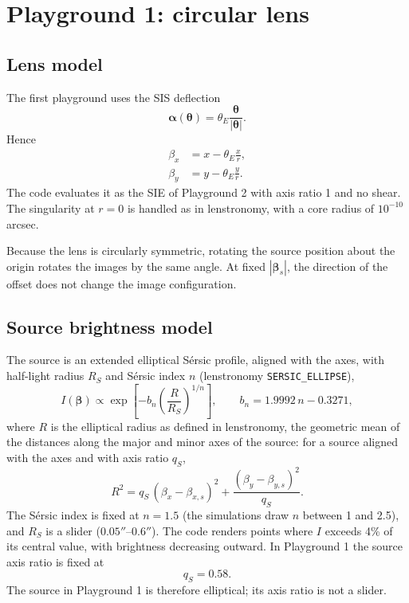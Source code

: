 \documentclass[11pt,a4paper]{article}
\newcommand{\be}{\boldsymbol{\beta}}
\newcommand{\thv}{\boldsymbol{\theta}}
\newcommand{\al}{\boldsymbol{\alpha}}
\begin{document}
\section{Playground 1: circular lens}
\subsection{Lens model}
The first playground uses the SIS deflection
\begin{equation}
  \al(\thv)=\theta_E\frac{\thv}{|\thv|}.
\end{equation}
Hence
\begin{align}
  \beta_x &= x-\theta_E\frac{x}{r},\\
  \beta_y &= y-\theta_E\frac{y}{r}.
\end{align}
The code evaluates it as the SIE of Playground 2 with axis ratio 1 and no shear. The singularity at $r=0$ is handled as in lenstronomy, with a core radius of $10^{-10}$ arcsec.

Because the lens is circularly symmetric, rotating the source position about the origin rotates the images by the same angle. At fixed $|\be_s|$, the direction of the offset does not change the image configuration.

\subsection{Source brightness model}
The source is an extended elliptical S\'ersic profile, aligned with the axes, with half-light radius $R_S$ and S\'ersic index $n$ (lenstronomy \texttt{SERSIC\_ELLIPSE}),
\begin{equation}
 I(\be)\propto\exp\!\left[-b_n\left(\frac{R}{R_S}\right)^{1/n}\right],\qquad b_n=1.9992\,n-0.3271,
 \label{eq:sourceq}
\end{equation}
where $R$ is the elliptical radius as defined in lenstronomy, the geometric mean of the distances along the major and minor axes of the source: for a source aligned with the axes and with axis ratio $q_S$,
\begin{equation}
 R^2=q_S\,(\beta_x-\beta_{x,s})^2+\frac{(\beta_y-\beta_{y,s})^2}{q_S}.
\end{equation}
The S\'ersic index is fixed at $n=1.5$ (the simulations draw $n$ between 1 and 2.5), and $R_S$ is a slider ($0.05''$--$0.6''$). The code renders points where $I$ exceeds 4\% of its central value, with brightness decreasing outward. In Playground 1 the source axis ratio is fixed at
\begin{equation}
 q_S=0.58.
\end{equation}
The source in Playground 1 is therefore elliptical; its axis ratio is not a slider.
\end{document}
